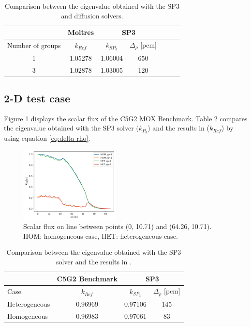 \documentclass[letterpaper]{article}
\begin{document}
\begin{table}[htbp!]
\centering
\caption{Comparison between the eigenvalue obtained with the SP3 and diffusion solvers.}
\begin{tabular}{ccccccc}
\toprule
 & Moltres      & \multicolumn{2}{c}{SP3}          \\
\midrule 
Number of groups & $k_{Ref}$    & $k_{SP_3}$ & $\Delta_\rho$ [pcm] \\
\midrule
1 & 1.05278     & 1.06004   & 650 \\
3 & 1.02878     & 1.03005   & 120 \\
\bottomrule
\end{tabular}
\label{tab:1d-keff}
\end{table}

\subsection{2-D test case}
\label{sec:results2d}

Figure \ref{res:2d-bench} displays the scalar flux of the C5G2 MOX Benchmark.
Table \ref{tab:2d-keff} compares the eigenvalue obtained with the SP3 solver ($k_{P_3}$) and the results in \cite{capilla_applications_2009} ($k_{Ref}$) by using equation \ref{eq:delta-rho}.

\begin{figure}[h!]
    \centering
    \includegraphics[width=0.45\textwidth]{figures/output-2g}
    \caption{Scalar flux on line between points (0, 10.71) and (64.26, 10.71). HOM: homogeneous case, HET: heterogeneous case.}
    \label{res:2d-bench}
\end{figure}

\begin{table}[htbp!]
\centering
\caption{Comparison between the eigenvalue obtained with the SP3 solver and the results in \cite{capilla_applications_2009}.}
\begin{tabular}{lccc}
\toprule
 & C5G2 Benchmark      & \multicolumn{2}{c}{SP3}          \\
\midrule
Case & $k_{Ref}$       & $k_{SP_3}$ & $\Delta_\rho$ [pcm] \\
\midrule
Heterogeneous & 0.96969  & 0.97106  & 145  \\
Homogeneous   & 0.96983  & 0.97061  &  83  \\
\bottomrule
\end{tabular}
\label{tab:2d-keff}
\end{table}
\end{document}
